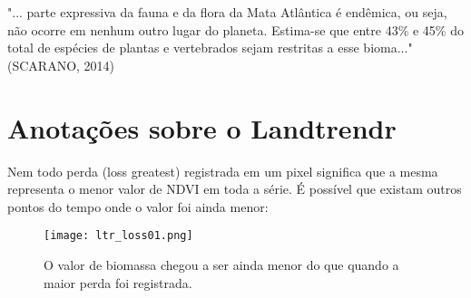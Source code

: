 \documentclass{article}
\begin{document}
"... parte expressiva da fauna e da flora da Mata Atlântica é endêmica, ou seja, não ocorre em nenhum outro lugar do planeta. Estima-se que entre 43\% e 45\% do total de espécies de plantas e vertebrados sejam restritas a esse bioma..." (SCARANO, 2014)


\section{Anotações sobre o Landtrendr}
Nem todo perda (loss greatest) registrada em um pixel significa que a mesma representa o menor valor de NDVI em toda a série. É possível que existam outros pontos do tempo onde o valor foi ainda menor:
\begin{figure}[htp]
    \centering
    \texttt{[image: ltr\_loss01.png]}
    \caption{O valor de biomassa chegou a ser ainda menor do que quando a maior perda foi registrada.}
    \label{fig:galaxy}
\end{figure}
\end{document}
